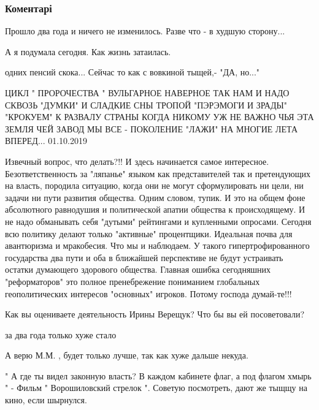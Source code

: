  
 
 
 
 
\subsubsection{Коментарі}
\label{sec:17_11_2021.fb.zharkih_denis.1.reintegracia_donbass.cmt}

\begin{itemize} %
Прошло два года и ничего не изменилось. Разве что - в худшую сторону...

А я подумала сегодня. Как жизнь затаилась.

одних пенсий скока... Сейчас то как с вовкиной тыщей,- "ДА, но..."


\obeycr
ЦИКЛ " ПРОРОЧЕСТВА "
ВУЛЬГАРНОЕ
НАВЕРНОЕ ТАК НАМ И НАДО
СКВОЗЬ "ДУМКИ" И СЛАДКИЕ СНЫ
ТРОПОЙ "ПЭРЭМОГИ И ЗРАДЫ"
"КРОКУЕМ" К РАЗВАЛУ СТРАНЫ
КОГДА НИКОМУ УЖ НЕ ВАЖНО
ЧЬЯ ЭТА ЗЕМЛЯ ЧЕЙ ЗАВОД
МЫ ВСЕ - ПОКОЛЕНИЕ "ЛАЖИ"
НА МНОГИЕ ЛЕТА ВПЕРЕД...
01.10.2019
\restorecr


Извечный вопрос, что делать?!! И здесь начинается самое интересное.
Безответственность за "ляпанье" языком как представителей так и претендующих на
власть, породила ситуацию, когда они не могут сформулировать ни цели, ни задачи
ни пути развития общества. Одним словом, тупик. И это на общем фоне абсолютного
равнодушия и политической апатии общества к происходящему. И не надо обманывать
себя "дутыми" рейтингами и купленными опросами. Сегодня всю политику делают
только "активные" процентщики. Идеальная почва для авантюризма и мракобесия.
Что мы и наблюдаем. У такого гипертрофированного государства два пути и оба в
ближайшей перспективе не будут устраивать остатки думающего здорового общества.
Главная ошибка сегодняшних "реформаторов" это полное пренебрежение пониманием
глобальных геополитических интересов "основных" игроков. Потому господа
думай-те!!!


Как вы оцениваете деятельность Ирины Верещук? Что бы вы ей посоветовали?

за два года только хуже стало

А верю М.М. , будет только лучше, так как хуже дальше некуда.


" А где ты видел законную власть? В каждом кабинете флаг, а под флагом хмырь "
- Фильм " Ворошиловский стрелок ". Советую посмотреть, дают же тыщщу на кино,
если шырнулся.

\end{itemize} %
